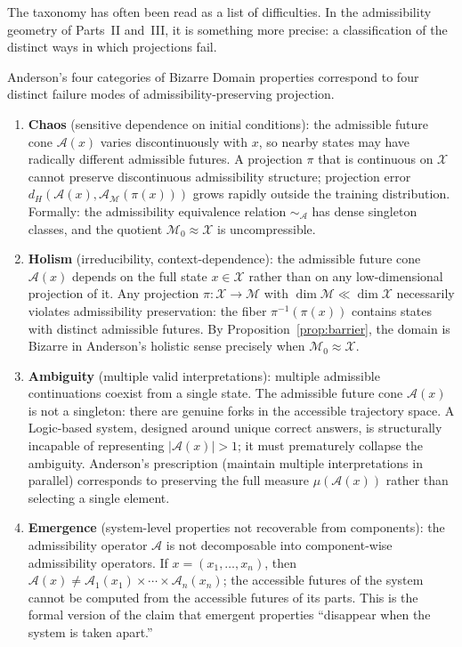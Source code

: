\documentclass[12pt, a4paper, oneside]{book}
\newcommand{\Adm}{\mathcal{A}}
\newcommand{\X}{\mathcal{X}}
\newcommand{\M}{\mathcal{M}}
\newcommand{\proj}{\pi}
\newcommand{\dH}{d_H}
\newcommand{\SA}{{\sim_{\!\Adm}}}
\begin{document}
The taxonomy has often been read as a list of difficulties.
In the admissibility geometry of Parts~II and~III, it is something more
precise: a classification of the distinct ways in which projections fail.

\begin{proposition}
\label{prop:bizarre-domains}
Anderson's four categories of Bizarre Domain properties correspond to
four distinct failure modes of admissibility-preserving projection.

\begin{enumerate}
  \item \textbf{Chaos} (sensitive dependence on initial conditions):
    the admissible future cone $\Adm(x)$ varies discontinuously with
    $x$, so nearby states may have radically different admissible
    futures. A projection $\proj$ that is continuous on $\X$ cannot
    preserve discontinuous admissibility structure; projection error
    $\dH(\Adm(x), \Adm_\M(\proj(x)))$ grows rapidly outside the
    training distribution. Formally: the admissibility equivalence
    relation $\SA$ has dense singleton classes, and the quotient
    $\M_0 \approx \X$ is uncompressible.

  \item \textbf{Holism} (irreducibility, context-dependence):
    the admissible future cone $\Adm(x)$ depends on the full state
    $x \in \X$ rather than on any low-dimensional projection of it.
    Any projection $\proj : \X \to \M$ with $\dim \M \ll \dim \X$
    necessarily violates admissibility preservation: the fiber
    $\proj^{-1}(\proj(x))$ contains states with distinct admissible
    futures. By Proposition~\ref{prop:barrier}, the domain is Bizarre
    in Anderson's holistic sense precisely when $\M_0 \approx \X$.

  \item \textbf{Ambiguity} (multiple valid interpretations):
    multiple admissible continuations coexist from a single state.
    The admissible future cone $\Adm(x)$ is not a singleton: there
    are genuine forks in the accessible trajectory space. A
    Logic-based system, designed around unique correct answers, is
    structurally incapable of representing $|\Adm(x)| > 1$; it must
    prematurely collapse the ambiguity. Anderson's prescription
    (maintain multiple interpretations in parallel) corresponds to
    preserving the full measure $\mu(\Adm(x))$ rather than selecting
    a single element.

  \item \textbf{Emergence} (system-level properties not recoverable
    from components): the admissibility operator $\Adm$ is not
    decomposable into component-wise admissibility operators.
    If $x = (x_1, \ldots, x_n)$, then $\Adm(x) \neq \Adm_1(x_1)
    \times \cdots \times \Adm_n(x_n)$; the accessible futures of the
    system cannot be computed from the accessible futures of its parts.
    This is the formal version of the claim that emergent properties
    ``disappear when the system is taken apart.''
\end{enumerate}
\end{proposition}
\end{document}
